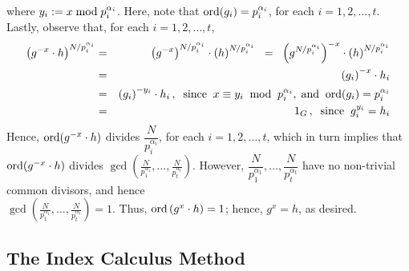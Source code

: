 \begin{itemize}
{		where $y_{i} := x \; \textnormal{mod} \; p_{i}^{\alpha_{i}}$.
		Here, note that $\textnormal{ord}(g_{i}) = p_{i}^{\alpha_{i}}$, for each $i = 1,2,\ldots,t$.
		Lastly, observe that, for each $i = 1,2,\ldots,t$,
		\begin{eqnarray*}
		\left(g^{-x}\cdot h\right)^{N/p_{i}^{\alpha_{i}}}
		&=& \left(g^{-x}\right)^{N/p_{i}^{\alpha_{i}}} \cdot \left(h\right)^{N/p_{i}^{\alpha_{i}}}
		\;\;=\;\; \left(g^{N/p_{i}^{\alpha_{i}}}\right)^{-x} \cdot \left(h\right)^{N/p_{i}^{\alpha_{i}}} \\
		&=& \left(g_{i}\right)^{-x} \cdot h_{i} \\
		&=& \left(g_{i}\right)^{-y_{i}} \cdot h_{i}\,,
			\;\;\textnormal{since}\;\; x \equiv y_{i}\;\;\textnormal{mod}\;\;p_{i}^{\alpha_{i}},
			\;\textnormal{and}\;\;\textnormal{ord}(g_{i}) = p_{i}^{\alpha_{i}} \\
		&=& 1_{G}\,,\;\;\textnormal{since}\;\;g_{i}^{y_{i}} = h_{i}\\
		\end{eqnarray*}
		Hence, $\textnormal{ord}(g^{-x}\cdot h)$ divides $\dfrac{N}{p_{i}^{\alpha_{i}}}$, for each $i = 1,2,\ldots,t$,
		which in turn implies that
		$\textnormal{ord}(g^{-x}\cdot h)$ divides $\gcd\left(\frac{N}{p_{1}^{\alpha_{1}}},\ldots,\frac{N}{p_{t}^{\alpha_{t}}}\right)$.
		However, $\dfrac{N}{p_{1}^{\alpha_{1}}},\ldots,\dfrac{N}{p_{t}^{\alpha_{t}}}$ have no non-trivial common divisors,
		and hence\\ $\gcd\left(\frac{N}{p_{1}^{\alpha_{1}}},\ldots,\frac{N}{p_{t}^{\alpha_{t}}}\right) = 1$.
		Thus, $\textnormal{ord}\left(g^{x}\cdot h\right) = 1$; hence, $g^{x} = h$, as desired.
		}

\end{itemize}

\subsection{The Index Calculus Method}



